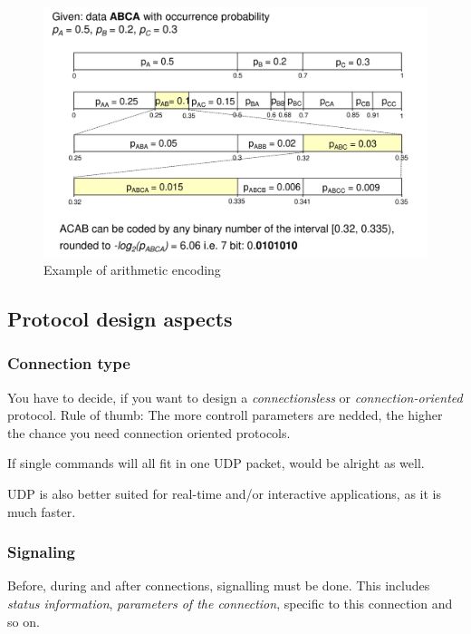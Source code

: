 \documentclass[english]{panikzettel}
\begin{document}
	\begin{figure}[H]
		\centering
		\includegraphics[width=\textwidth]{img/2-arithmetic-encoding.png}
		\caption{Example of arithmetic encoding}
		\label{img-2-arithmetic-encoding}
	\end{figure}

	\subsection{Protocol design aspects}
	\label{ss-protocol-design-aspects}

	\subsubsection{Connection type}
	\label{sss-connection-type}
	
		You have to decide, if you want to design a \textit{connectionsless} or \textit{connection-oriented} protocol. 
	Rule of thumb: The more controll parameters are nedded, the higher the chance you need connection oriented protocols.
	
	If single commands will all fit in one UDP packet, would be alright as well.

	UDP is also better suited for real-time and/or interactive applications, as it is much faster.
	
	\subsubsection{Signaling}
	\label{sss-signaling}
	
	Before, during and after connections, signalling must be done.
	This includes \textit{status information}, \textit{parameters of the connection}, specific to this connection and so on.
\end{document}
